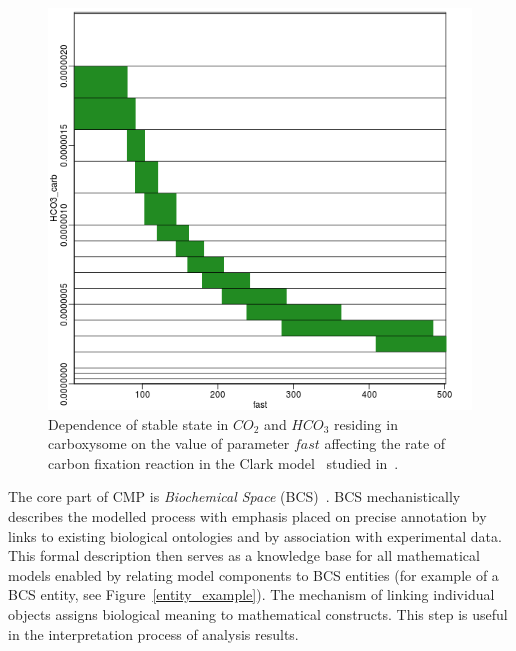\documentclass[11pt,a4paper]{report}
\begin{document}
\begin{figure}[!h]
\begin{minipage}{0.45\textwidth}
\begin{center}
\includegraphics[scale=0.3]{images/clark_fast_vs_hco3.png}
\end{center}
\end{minipage}
\caption{Dependence of stable state in $CO_2$ and $HCO_3$ residing in carboxysome on the value of parameter $\mathit{fast}$ affecting the rate of carbon fixation reaction in the Clark model~\cite{clark14} studied in~\cite{benevs2018fully}.}\label{attractors}
\end{figure}

The core part of CMP is \emph{Biochemical Space} (BCS)~\cite{BCS}. BCS mechanistically describes the modelled process with emphasis placed on precise annotation by links to existing biological ontologies and by association with experimental data. This formal description then serves as a knowledge base for all mathematical models enabled by relating model components to BCS entities (for example of a BCS entity, see Figure~\ref{entity_example}). The mechanism of linking individual objects assigns biological meaning to mathematical constructs. This step is useful in the interpretation process of analysis results.
\end{document}
